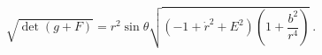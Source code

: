 \begin{equation}
\sqrt{\det(g+F)}=  r^2 \sin \theta \sqrt{(-1+\dot{r}^2
+E^2)\left(1+\frac{b^2}{r^4}\right)} \ .
\end{equation}

